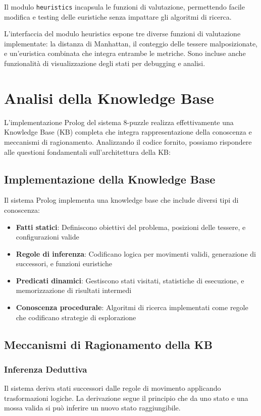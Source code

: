 \documentclass[12pt,a4paper]{report}
\theoremstyle{definition}
\begin{document}
Il modulo \texttt{heuristics} incapsula le funzioni di valutazione, permettendo facile modifica e testing delle euristiche senza impattare gli algoritmi di ricerca.

L'interfaccia del modulo heuristics espone tre diverse funzioni di valutazione implementate: la distanza di Manhattan, il conteggio delle tessere malposizionate, e un'euristica combinata che integra entrambe le metriche. Sono incluse anche funzionalità di visualizzazione degli stati per debugging e analisi.

\section{Analisi della Knowledge Base}

L'implementazione Prolog del sistema 8-puzzle realizza effettivamente una Knowledge Base (KB) completa che integra rappresentazione della conoscenza e meccanismi di ragionamento. Analizzando il codice fornito, possiamo rispondere alle questioni fondamentali sull'architettura della KB:

\subsection{Implementazione della Knowledge Base}

Il sistema Prolog implementa una knowledge base che include diversi tipi di conoscenza:

\begin{itemize}
    \item \textbf{Fatti statici}: Definiscono obiettivi del problema, posizioni delle tessere, e configurazioni valide
    \item \textbf{Regole di inferenza}: Codificano logica per movimenti validi, generazione di successori, e funzioni euristiche  
    \item \textbf{Predicati dinamici}: Gestiscono stati visitati, statistiche di esecuzione, e memorizzazione di risultati intermedi
    \item \textbf{Conoscenza procedurale}: Algoritmi di ricerca implementati come regole che codificano strategie di esplorazione
\end{itemize}

\subsection{Meccanismi di Ragionamento della KB}

\subsubsection{Inferenza Deduttiva}
Il sistema deriva stati successori dalle regole di movimento applicando trasformazioni logiche. La derivazione segue il principio che da uno stato e una mossa valida si può inferire un nuovo stato raggiungibile.
\end{document}
